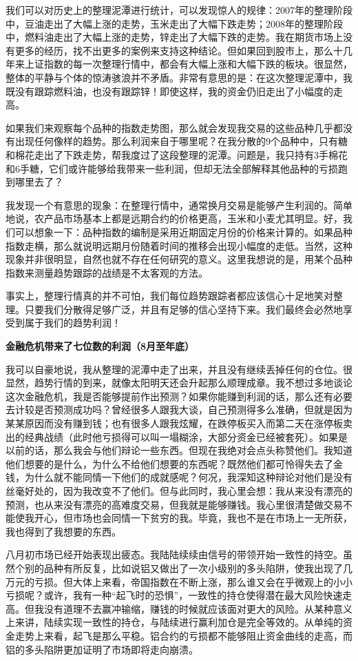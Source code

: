 我们可以对历史上的整理泥潭进行统计，可以发现惊人的规律：2007年的整理阶段中，豆油走出了大幅上涨的走势，玉米走出了大幅下跌走势；2008年的整理阶段中，燃料油走出了大幅上涨的走势，锌走出了大幅下跌的走势。我在期货市场上没有更多的经历，找不出更多的案例来支持这种结论。但如果回到股市上，那么十几年来上证指数的每一次整理行情中，都会有大幅上涨和大幅下跌的板块。很显然，整体的平静与个体的惊涛骇浪并不矛盾。非常有意思的是：在这次整理泥潭中，我既没有跟踪燃料油，也没有跟踪锌！即使这样，我的资金仍旧走出了小幅度的走高。

如果我们来观察每个品种的指数走势图，那么就会发现我交易的这些品种几乎都没有出现任何像样的趋势。那么利润来自于哪里呢？在我分散的9个品种中，只有糖和棉花走出了下跌走势，帮我度过了这段整理的泥潭。问题是，我只持有3手棉花和6手糖，它们或许能够给我带来一些利润，但却无法全部解释其他品种的亏损跑到哪里去了？

我发现一个有意思的现象：在整理行情中，通常换月交易是能够产生利润的。简单地说，农产品市场基本上都是远期合约的价格更高，玉米和小麦尤其明显。好，我们可以想象一下：品种指数的编制是采用近期固定月份的价格来计算的。如果品种指数走横，那么就说明远期月份随着时间的推移会出现小幅度的走低。当然，这种现象并非很明显，自然也就不存在任何研究的意义。这里我想说的是，用某个品种指数来测量趋势跟踪的战绩是不太客观的方法。

事实上，整理行情真的并不可怕，我们每位趋势跟踪者都应该信心十足地笑对整理。只要我们分散得足够广泛，并且有足够的信心坚持下来。我们最终会必然地享受到属于我们的趋势利润！

\textbf{金融危机带来了七位数的利润（8月至年底）}

我可以自豪地说，我从整理的泥潭中走了出来，并且没有继续丢掉任何的仓位。很显然，趋势行情的到来，就像太阳明天还会升起那么顺理成章。我不想过多地谈论这次金融危机，我是否能够提前作出预测？如果你能赚到利润的话，那么还有必要去计较是否预测成功吗？曾经很多人跟我大谈，自己预测得多么准确，但就是因为某某原因而没有赚到钱；也有很多人跟我炫耀，在跌停板买入而第二天在涨停板卖出的经典战绩（此时他亏损得可以叫一塌糊涂，大部分资金已经被套死）。如果是以前的话，那么我会与他们辩论一些东西。但现在我绝对会点头称赞他们。我知道他们想要的是什么，为什么不给他们想要的东西呢？既然他们都可怜得失去了金钱，为什么就不能同情一下他们的成就感呢？何况，我深知这种辩论对他们是没有丝毫好处的，因为我改变不了他们。但与此同时，我心里会想：我从来没有漂亮的预测，也从来没有漂亮的高难度交易，但我就是能够赚钱。我心里很清楚做交易不能使我开心，但市场也会同情一下贫穷的我。毕竟，我也不是在市场上一无所获，我也得到了我想要的东西。

八月初市场已经开始表现出疲态。我陆陆续续由信号的带领开始一致性的持空。虽然个别的品种有所反复，比如说铝又做出了一次小级别的多头陷阱，使我出现了几万元的亏损。但大体上来看，帝国指数在不断上涨，那么谁又会在乎微观上的小小亏损呢？或许，我有一种“起飞时的恐惧”，一致性的持仓使得潜在最大风险快速走高。但我没有道理不去赢冲输缩，赚钱的时候就应该面对更大的风险。从某种意义上来讲，陆续实现一致性的持仓，与陆续进行赢利加仓是完全等效的。从单纯的资金走势上来看，起飞是那么平稳。铝合约的亏损都不能够阻止资金曲线的走高，而铝的多头陷阱更加证明了市场即将走向崩溃。

